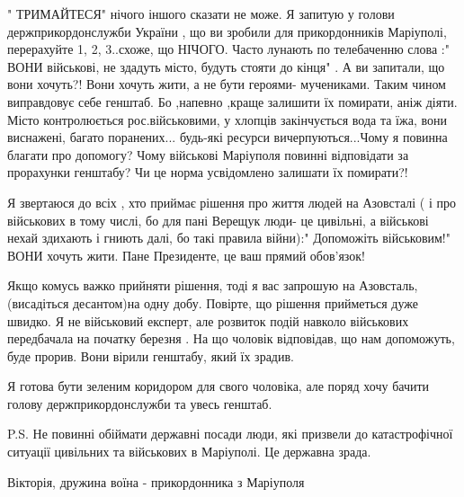 " ТРИМАЙТЕСЯ" нічого іншого сказати не може. Я запитую у голови
держприкордонслужби  України , що ви зробили  для прикордонників  Маріуполі,
перерахуйте 1, 2, 3..схоже, що НІЧОГО. Часто лунають  по телебаченню слова :"
ВОНИ військові,  не здадуть  місто,  будуть стояти до кінця" . А ви запитали,
що вони хочуть?!  Вони хочуть жити, а не бути героями- мучениками. Таким чином
виправдовує  себе генштаб. Бо ,напевно ,краще залишити  їх помирати,  аніж
діяти. Місто контролюється  рос.військовими, у хлопців  закінчується вода та
їжа, вони виснажені,  багато поранених... будь-які ресурси вичерпуються...Чому
я повинна  благати про допомогу? Чому військові Маріуполя повинні відповідати
за прорахунки  генштабу? Чи це норма усвідомлено  залишати  їх помирати?! 

Я звертаюся до всіх , хто приймає  рішення про життя людей  на Азовсталі ( і
про військових  в тому числі, бо для пані Верещук люди- це цивільні,  а
військові  нехай здихають і гниють далі, бо такі правила війни):" Допоможіть
військовим!" ВОНИ хочуть жити. Пане Президенте,  це ваш прямий обов'язок! 

Якщо комусь  важко прийняти рішення, тоді я вас запрошую  на Азовсталь,
(висадіться десантом)на одну добу. Повірте, що рішення  прийметься дуже швидко.
Я не військовий експерт,  але розвиток  подій навколо військових   передбачала
на початку  березня . На що чоловік  відповідав,  що нам допоможуть,  буде
прорив. Вони вірили генштабу,  який їх зрадив. 

Я готова бути зеленим коридором  для свого чоловіка,  але поряд хочу бачити
голову держприкордонслужби  та увесь генштаб. 

P.S. Не повинні  обіймати державні  посади  люди,  які призвели до
катастрофічної ситуації  цивільних  та військових в Маріуполі. Це державна
зрада.

Вікторія, дружина воїна - прикордонника з Маріуполя
